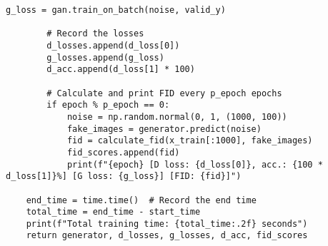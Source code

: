 \begin{lstlisting}[style=mypython, caption=GAN model with dense layers]
        g_loss = gan.train_on_batch(noise, valid_y)

        # Record the losses
        d_losses.append(d_loss[0])
        g_losses.append(g_loss)
        d_acc.append(d_loss[1] * 100)
        
        # Calculate and print FID every p_epoch epochs
        if epoch % p_epoch == 0:
            noise = np.random.normal(0, 1, (1000, 100))
            fake_images = generator.predict(noise)
            fid = calculate_fid(x_train[:1000], fake_images)
            fid_scores.append(fid)
            print(f"{epoch} [D loss: {d_loss[0]}, acc.: {100 * d_loss[1]}%] [G loss: {g_loss}] [FID: {fid}]")

    end_time = time.time()  # Record the end time
    total_time = end_time - start_time
    print(f"Total training time: {total_time:.2f} seconds")
    return generator, d_losses, g_losses, d_acc, fid_scores
\end{lstlisting}




